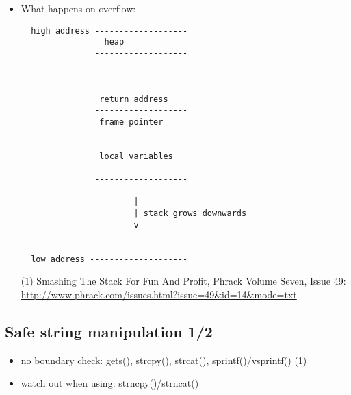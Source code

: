 \begin{itemize}
  \item What happens on overflow:

\begin{verbatim}
  high address -------------------
                 heap
               -------------------


               -------------------
                return address
               -------------------
                frame pointer
               -------------------

                local variables

               -------------------

                       |
                       | stack grows downwards
                       v


  low address --------------------
\end{verbatim}
  \item[(1)] Smashing The Stack For Fun And Profit, Phrack Volume Seven, Issue
  49: \url{http://www.phrack.com/issues.html?issue=49\&id=14\&mode=txt}
\end{itemize}


\subsection{Safe string manipulation 1/2}

\begin{itemize}
  \item no boundary check: gets(), strcpy(), strcat(), sprintf()/vsprintf() (1)
  \item watch out when using: strncpy()/strncat()
\end{itemize}


